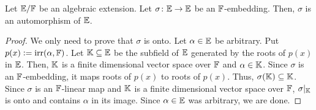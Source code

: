 \begin{lem} \label{lem:F-embedding-is-automorphism}
    Let $\mathbb{E}/\mathbb{F}$ be an algebraic extension. Let $\sigma \colon \mathbb{E} \to \mathbb{E}$ be an $\mathbb{F}$-embedding. Then, $\sigma$ is an automorphism of $\mathbb{E}$.
\end{lem}
\begin{proof}
    We only need to prove that $\sigma$ is onto. Let $\alpha \in \mathbb{E}$ be arbitrary. Put $p(x) \vcentcolon= \operatorname{irr}(\alpha, \mathbb{F})$. Let $\mathbb{K} \subseteq \mathbb{E}$ be the subfield of $\mathbb{E}$ generated by the roots of $p(x)$ in $\mathbb{E}$. Then, $\mathbb{K}$ is a finite dimensional vector space over $\mathbb{F}$ and $\alpha \in \mathbb{K}$. Since $\sigma$ is an $\mathbb{F}$-embedding, it maps roots of $p(x)$ to roots of $p(x)$. Thus, $\sigma(\mathbb{K}) \subseteq \mathbb{K}$. Since $\sigma$ is an $\mathbb{F}$-linear map and $\mathbb{K}$ is a finite dimensional vector space over $\mathbb{F}$, $\sigma|_{\mathbb{K}}$ is onto and contains $\alpha$ in its image. Since $\alpha \in \mathbb{E}$ was arbitrary, we are done.
\end{proof}

